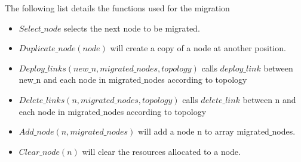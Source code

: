 The following list details the functions used for the migration
\begin{itemize}
\item $Select\_node$ selects the next node to be migrated.
\item $Duplicate\_node(node)$ will create a copy of a node at another position.
\item $Deploy\_links(new\_n,migrated\_nodes,topology)$ calls $deploy\_link$ between new$\_$n and each node in migrated$\_$nodes according to topology
\item $Delete\_links(n,migrated\_nodes,topology)$ calls $delete\_link$ between n and each node in migrated$\_$nodes according to topology
\item $Add\_node(n,migrated\_nodes)$ will add a node n to array migrated$\_$nodes.
\item $Clear\_node(n)$ will clear the resources allocated to a node.
\end{itemize}